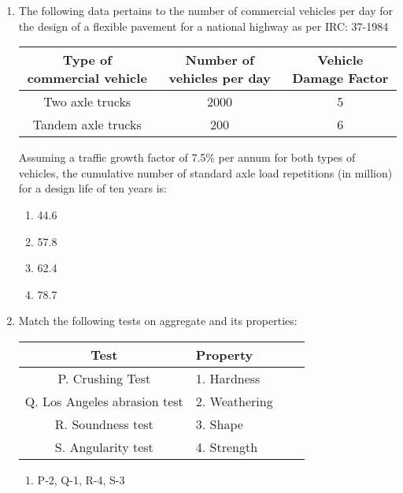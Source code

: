 \documentclass[journal]{IEEEtran}
\begin{document}
\begin{enumerate}
{        }
    \item{
	
			The following data pertains to the number of commercial vehicles per day for the design of a flexible pavement for a national highway as per IRC: 37-1984 
			
			\begin{center}
				\begin{tabular}{|c|c|c|}
					\hline
					Type of commercial vehicle & Number of vehicles per day & Vehicle Damage Factor \\
					\hline
					Two axle trucks & 2000 & 5 \\
					Tandem axle trucks & 200 & 6 \\
					\hline
				\end{tabular}
			\end{center}
			
			Assuming a traffic growth factor of 7.5\% per annum for both types of vehicles, the cumulative number of standard axle load repetitions (in million) for a design life of ten years is:
			\text{   }\hfill
			
			\begin{multicols}{4}
				\begin{enumerate}
					\item 44.6
					\item 57.8
					\item 62.4
					\item 78.7
				\end{enumerate}
			\end{multicols}
			
		}
    \item{
	
			Match the following tests on aggregate and its properties:
			\begin{center}
				\begin{tabular}{|c|l|c|l|}
					\hline
					\textbf{Test} & \textbf{Property}  \\ \hline
					P. Crushing Test & 1. Hardness \\ \hline
					Q. Los Angeles abrasion test & 2. Weathering \\ \hline
					R. Soundness test & 3. Shape \\ \hline
					S. Angularity test & 4. Strength \\ \hline
				\end{tabular}
			\end{center}
			\text{   }\hfill
			
			\begin{multicols}{2}
				\begin{enumerate}
					\item  P-2, Q-1, R-4, S-3  
					

\end{enumerate}
\end{multicols}}
\end{enumerate}
\end{document}
